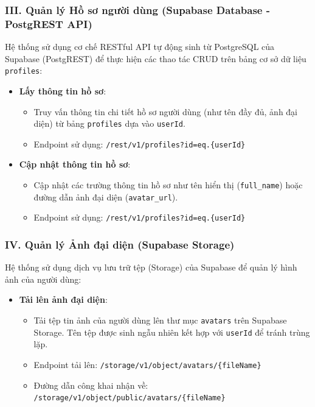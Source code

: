 \subsubsection{III. Quản lý Hồ sơ người dùng (Supabase Database - PostgREST API)}

Hệ thống sử dụng cơ chế RESTful API tự động sinh từ PostgreSQL của Supabase (PostgREST) để thực hiện các thao tác CRUD trên bảng cơ sở dữ liệu \texttt{profiles}:

\begin{itemize}
\item \textbf{Lấy thông tin hồ sơ}:
\begin{itemize}
\item Truy vấn thông tin chi tiết hồ sơ người dùng (như tên đầy đủ, ảnh đại diện) từ bảng \texttt{profiles} dựa vào \texttt{userId}.
\item Endpoint sử dụng: \texttt{/rest/v1/profiles?id=eq.\{userId\}}
\end{itemize}

\item \textbf{Cập nhật thông tin hồ sơ}:
\begin{itemize}
\item Cập nhật các trường thông tin hồ sơ như tên hiển thị (\texttt{full\_name}) hoặc đường dẫn ảnh đại diện (\texttt{avatar\_url}).
\item Endpoint sử dụng: \texttt{/rest/v1/profiles?id=eq.\{userId\}}
\end{itemize}
\end{itemize}

\subsubsection{IV. Quản lý Ảnh đại diện (Supabase Storage)}

Hệ thống sử dụng dịch vụ lưu trữ tệp (Storage) của Supabase để quản lý hình ảnh của người dùng:

\begin{itemize}
\item \textbf{Tải lên ảnh đại diện}:
\begin{itemize}
\item Tải tệp tin ảnh của người dùng lên thư mục \texttt{avatars} trên Supabase Storage. Tên tệp được sinh ngẫu nhiên kết hợp với \texttt{userId} để tránh trùng lặp.
\item Endpoint tải lên: \texttt{/storage/v1/object/avatars/\{fileName\}}
\item Đường dẫn công khai nhận về: \texttt{/storage/v1/object/public/avatars/\{fileName\}}
\end{itemize}
\end{itemize}

